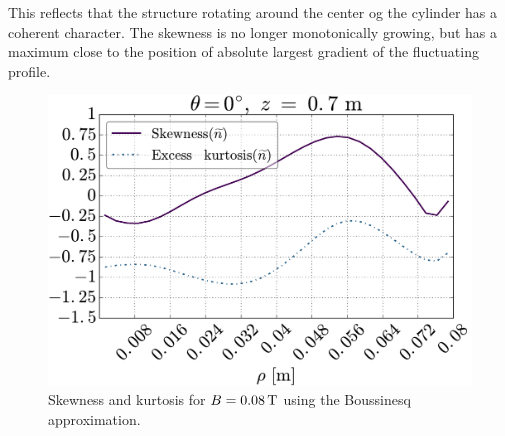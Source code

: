 This reflects that the structure rotating around the center og the cylinder has a coherent character.
The skewness is no longer monotonically growing, but has a maximum close to the position of absolute largest gradient of the fluctuating profile.
%
\begin{figure}[htb]
    \centering
    \includegraphics[width=1.0\textwidth]{fig/results/compareBouss/skewKurt008B}
    \caption{Skewness and kurtosis for $B=0.08\, \text{T}$ using the Boussinesq approximation.}
    \label{fig:skewKurt008B}
\end{figure}
%
